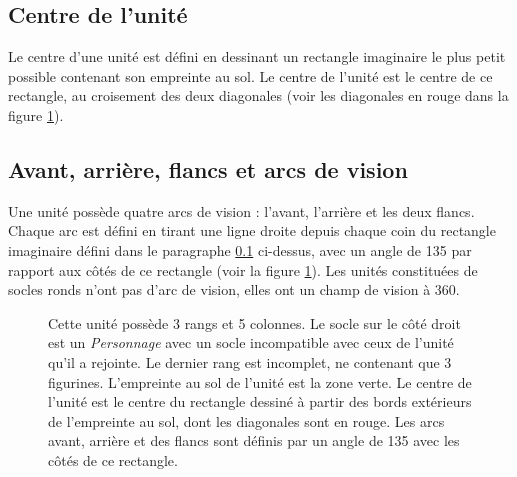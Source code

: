 \subsection{Centre de l'unité}
\label{centre_unite}

Le centre d'une unité est défini en dessinant un rectangle imaginaire le plus petit possible contenant son empreinte au sol. Le centre de l'unité est le centre de ce rectangle, au croisement des deux diagonales (voir les diagonales en rouge dans la figure \ref{figure/arcs}).

\subsection{Avant, arrière, flancs et arcs de vision}

Une unité possède quatre arcs de vision : l'avant, l'arrière et les deux flancs. Chaque arc est défini en tirant une ligne droite depuis chaque coin du rectangle imaginaire défini dans le paragraphe \ref{centre_unite} ci-dessus, avec un angle de \unit{135}{\text{\degree}} par rapport aux côtés de ce rectangle (voir la figure \ref{figure/arcs}). Les unités constituées de socles ronds n'ont pas d'arc de vision, elles ont un champ de vision à \unit{360}{\text{\degree}}.

\begin{figure}[!htbp]
\centering
\def\svgwidth{12cm}

\caption{Cette unité possède 3 rangs et 5 colonnes. Le socle sur le côté droit est un \emph{Personnage} avec un socle incompatible avec ceux de l'unité qu'il a rejointe. Le dernier rang est incomplet, ne contenant que 3 figurines. L'empreinte au sol de l'unité est la zone verte. Le centre de l'unité est le centre du rectangle dessiné à partir des bords extérieurs de l'empreinte au sol, dont les diagonales sont en rouge. Les arcs avant, arrière et des flancs sont définis par un angle de \unit{135}{\text{\degree}} avec les côtés de ce rectangle.}
\label{figure/arcs}
\end{figure}
